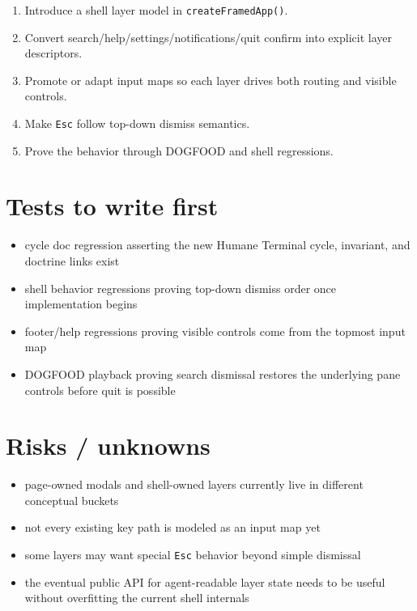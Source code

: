 \begin{enumerate}
\def\labelenumi{\arabic{enumi}.}
\tightlist
\item
  Introduce a shell layer model in \texttt{c\allowbreak{}r\allowbreak{}e\allowbreak{}a\allowbreak{}t\allowbreak{}e\allowbreak{}F\allowbreak{}r\allowbreak{}a\allowbreak{}m\allowbreak{}e\allowbreak{}d\allowbreak{}A\allowbreak{}p\allowbreak{}p\allowbreak{}(\allowbreak{})}.
\item
  Convert search/help/settings/notifications/quit confirm into explicit layer descriptors.
\item
  Promote or adapt input maps so each layer drives both routing and visible controls.
\item
  Make \texttt{E\allowbreak{}s\allowbreak{}c} follow top-down dismiss semantics.
\item
  Prove the behavior through DOGFOOD and shell regressions.
\end{enumerate}

\section{Tests to write first}\label{record-254-tests-to-write-first}

\begin{itemize}
\tightlist
\item
  cycle doc regression asserting the new Humane Terminal cycle, invariant, and doctrine links exist
\item
  shell behavior regressions proving top-down dismiss order once implementation begins
\item
  footer/help regressions proving visible controls come from the topmost input map
\item
  DOGFOOD playback proving search dismissal restores the underlying pane controls before quit is possible
\end{itemize}

\section{Risks / unknowns}\label{record-254-risks-unknowns}

\begin{itemize}
\tightlist
\item
  page-owned modals and shell-owned layers currently live in different conceptual buckets
\item
  not every existing key path is modeled as an input map yet
\item
  some layers may want special \texttt{E\allowbreak{}s\allowbreak{}c} behavior beyond simple dismissal
\item
  the eventual public API for agent-readable layer state needs to be useful without overfitting the current shell internals
\end{itemize}

